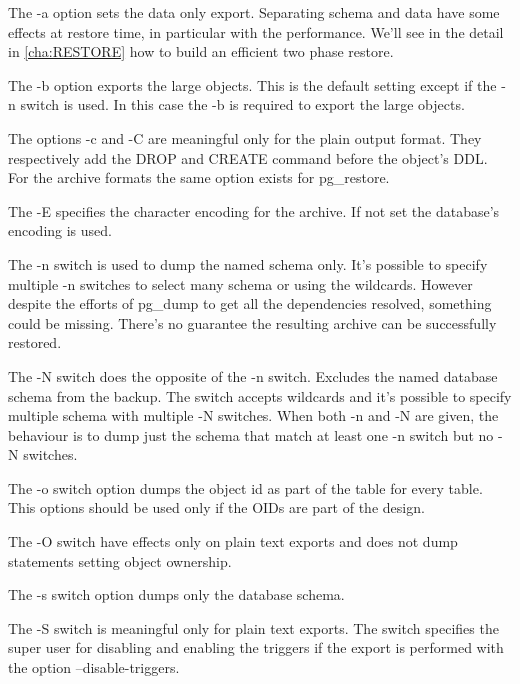 The -a option sets the data only export. Separating schema and data have some effects at restore
time, in particular with the performance. We'll see in the detail in \ref{cha:RESTORE} how to
build an efficient two phase restore.\newline

The -b option exports the large objects. This is the default setting except if the -n switch is
used. In this case the -b is required to export the large objects.\newline

The options -c and -C are meaningful only for the plain output format. They respectively add the
DROP and CREATE command before the object's DDL. For the archive formats the same option exists for
pg\_restore.\newline

The -E specifies the character encoding for the archive. If not set the database's encoding is
used.\newline

The -n switch is used to dump the named schema only. It's possible to specify multiple -n switches
to select many schema or using the wildcards. However despite the efforts of pg\_dump to get all
the dependencies resolved, something could be missing. There's no guarantee the resulting archive
can be successfully restored.\newline

The -N switch does the opposite of the -n switch. Excludes the named database schema from the backup. The
switch accepts wildcards and it's possible to specify multiple schema with multiple -N switches. When both
-n and -N are given, the behaviour is to dump just the schema that match at least one -n switch but no -N
switches. \newline

The -o switch option dumps the object id as part of the table for every table. This options should be
used only if the OIDs are part of the design. \newline

The -O switch have effects only on plain text exports and does not dump statements setting object
ownership.\newline

The -s switch option dumps only the database schema.\newline

The -S switch is meaningful only for plain text exports. The switch specifies the super user for disabling
and enabling the triggers if the export is performed with the option --disable-triggers. \newline

